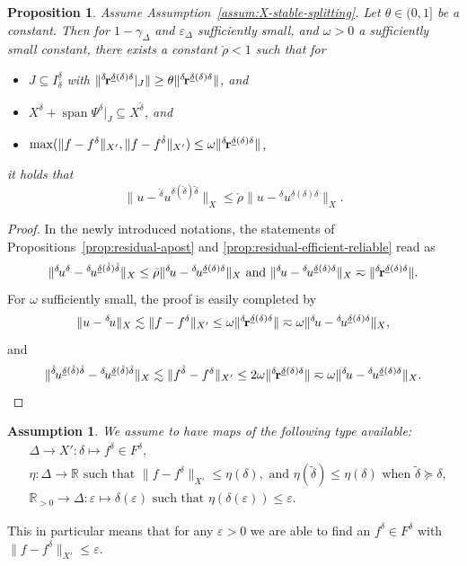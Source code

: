 \documentclass[11pt,a4paper,oneside,english]{amsart}
\numberwithin{equation}{section}
\numberwithin{theorem}{section}
\newtheorem{assum}[theorem]{Assumption}
\newtheorem{prop}[theorem]{Proposition}
\theoremstyle{definition}
\newcommand{\R}{\mathbb{R}}
\newcommand{\eps}{\varepsilon}
\DeclareMathOperator{\spann}{span}
\newcommand{\udelta}{{\underline{\delta}}}
\begin{document}
\begin{prop}
  \label{prop:contraction}
  Assume Assumption~\ref{assum:X-stable-splitting}. Let $\theta \in (0,1]$ be a constant. Then for $1-\gamma_\Delta$ and $\eps_\Delta$
  sufficiently small, and $\omega>0$ a sufficiently small constant, there exists
  a constant $\check{\rho}<1$ such that for
  \begin{itemize}
    \item $J \subseteq I_\delta^\udelta$ with $\|{}^{\delta\!}{\bf r}^{\udelta(\delta) \delta}|_J\| \geq \theta \|{}^{\delta\!}{\bf r}^{\udelta(\delta) \delta}\|$, and
    \item $X^\delta+\spann \Psi^\delta|_{J} \subseteq X^{\check{\delta}}$, and
    \item $\max(\|f-f^\delta\|_{X'}, \|f-f^{\check{\delta}}\|_{X'}) \leq \omega \|{}^{\delta\!}{\bf r}^{\udelta(\delta) \delta}\|$,
  \end{itemize}
  it holds that
  \[
    \|u-{}^{\check{\delta}\!}u^{\udelta(\check{\delta}) \check{\delta}}\|_X \leq \check{\rho} \|u-{}^{\delta\!}u^{\udelta(\delta)\delta}\|_X.
  \]
\end{prop}
\begin{proof}
  In the newly introduced notations, the statements of Propositions~\ref{prop:residual-apost}
  and \ref{prop:residual-efficient-reliable} read as
  \[
    \|{}^{\delta\!}u^\delta-{}^{\delta\!}u^{\udelta(\check{\delta}) \check{\delta}}\|_X \leq \bar{\rho} \|{}^{\delta\!}u-{}^{\delta\!}u^{\udelta(\delta)\delta}\|_X \text{ and }
    \|{}^{\delta\!}u-{}^{\delta\!}u^{\udelta(\delta)\delta}\|_X \eqsim \|{}^{\delta\!}{\bf r}^{\udelta(\delta) \delta}\|.
  \]
  For $\omega$ sufficiently small, the proof is easily completed by
  \[
    \|u-{}^{\delta\!}u\|_X \lesssim \|f-f^\delta\|_{X'} \leq \omega \|{}^{\delta\!}{\bf r}^{\udelta(\delta) \delta}\| \eqsim \omega \|{}^{\delta\!}u-{}^{\delta\!}u^{\udelta(\delta)\delta}\|_X,
  \]
  and
  \[
    \|{}^{\check{\delta}\!}u^{\udelta(\check{\delta}) \check{\delta}}-{}^{\delta\!}u^{\udelta(\check{\delta}) \check{\delta}}\|_X \lesssim
    \|f^{\check{\delta}}-f^\delta\|_{X'}
    \leq 2 \omega \|{}^{\delta\!}{\bf r}^{\udelta(\delta) \delta}\|\eqsim \omega \|{}^{\delta\!}u-{}^{\delta\!}u^{\udelta(\delta)\delta}\|_X.\qedhere
  \]
\end{proof}

\begin{assum}
  \label{assum:rhs}
  We assume to have maps of the following type available:
  \begin{align*}
    &\Delta \rightarrow X' \colon \delta \mapsto f^\delta \in F^\delta,\\
    &\eta\colon \Delta \rightarrow \R \text{ such that } \|f-f^\delta\|_{X'} \leq \eta(\delta), \text{ and } \eta(\tilde \delta)\leq \eta(\delta) \text{ when } \tilde{\delta} \succeq \delta, \\
    &\R_{>0} \rightarrow \Delta\colon \eps \mapsto \delta(\eps) \text{ such that } \eta(\delta(\eps)) \leq \eps.
  \end{align*}
\end{assum}
This in particular means that for any $\eps>0$ we are able to find an $f^\delta \in F^\delta$
with $\|f-f^\delta\|_{X'} \leq \eps$.
\end{document}
